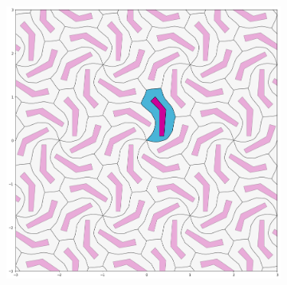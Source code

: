 \documentclass[12pt]{report}
\begin{document}
\begin{figure}[H]
\begin{subfigure}[b]{0.32\textwidth}
    \label{fig:f8}
  \end{subfigure}
  \begin{subfigure}[b]{0.32\textwidth}
    \includegraphics[width=.9\textwidth]{poligon3.png}
    \label{fig:f9}
  \end{subfigure}
\end{figure}
\end{document}

